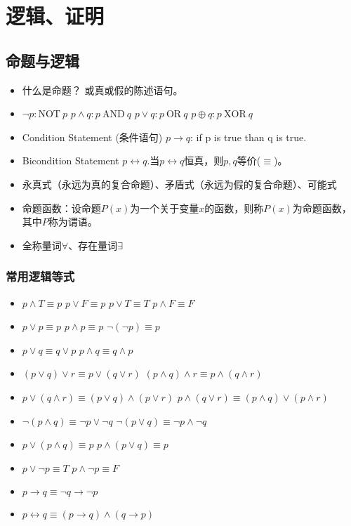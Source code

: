 \section{逻辑、证明}

\subsection{命题与逻辑}
\begin{itemize}
    \item 什么是命题？ 或真或假的陈述语句。
    \item $\lnot p: \mathrm{NOT} \ p$ \quad $p \land q:p \ \mathrm{AND} \ q$ \quad $p \lor q:p \ \mathrm{OR} \ q$ \quad $p \oplus q:p \ \mathrm{XOR} \ q$
    \item Condition Statement (条件语句) $p \rightarrow q$: if p is true than q is true.
    \item Bicondition Statement $p \leftrightarrow q$.当$p \leftrightarrow q$恒真，则$p,q$等价($\equiv$)。
    \item 永真式（永远为真的复合命题）、矛盾式（永远为假的复合命题）、可能式
    \item 命题函数：设命题$P(x)$为一个关于变量$x$的函数，则称$P(x)$为命题函数，其中$P$称为谓语。
    \item 全称量词$\forall$、存在量词$\exists$
\end{itemize}

\subsubsection*{常用逻辑等式}
\begin{itemize}
    \item $p \land T \equiv p$ \quad $p \lor F \equiv p$ \quad $p \lor T \equiv T$ \quad $p \land F \equiv F$
    \item $p \lor p \equiv p$ \quad $p \land p \equiv p$ \quad $\lnot (\lnot p) \equiv p$
    \item $p \lor q \equiv q \lor p$ \quad $p \land q \equiv q \land p$
    \item $(p \lor q) \lor r \equiv p \lor (q \lor r)$ \quad $(p \land q) \land r \equiv p \land (q \land r)$
    \item $p \lor (q \land r) \equiv (p \lor q) \land (p \lor r)$ \quad $p \land (q \lor r) \equiv (p \land q) \lor (p \land r)$
    \item $\lnot (p \land q) \equiv \lnot p \lor \lnot q$ \quad $\lnot (p \lor q) \equiv \lnot p \land \lnot q$
    \item $p \lor (p \land q) \equiv p$ \quad $p \land (p \lor q) \equiv p$
    \item $p \lor \lnot p \equiv T$ \quad $p \land \lnot p \equiv F$
    \item $p \rightarrow q \equiv \lnot q \rightarrow \lnot p$
    \item $p \leftrightarrow q \equiv (p \rightarrow q) \land (q \rightarrow p)$
\end{itemize}

